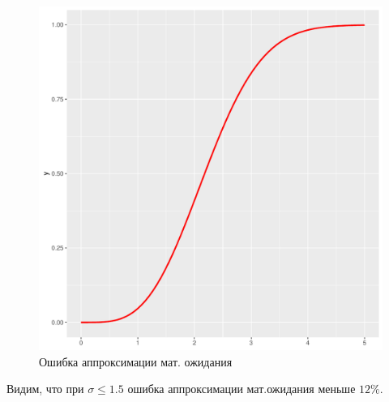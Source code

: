 \documentclass[12pt]{article}
\begin{document}
	\begin{figure}[h]
		\begin{center}
			\begin{minipage}[h]{0.5\linewidth}
				\includegraphics[width=1\linewidth]{img/m_sig.pdf}
				\caption{Ошибка аппроксимации мат. ожидания} %
				\label{ris:image1} %
			\end{minipage}
			
		\end{center}
	\end{figure}
	
	Видим, что при $\sigma\leq1.5$ ошибка аппроксимации мат.ожидания меньше $12\%$. 
	
\end{document}

